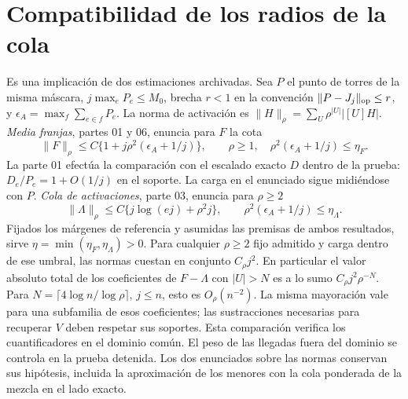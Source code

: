 \section{Compatibilidad de los radios de la cola}
Es una implicación de dos estimaciones archivadas. Sea $P$ el punto de torres
de la misma máscara, $j\max_e P_e\le M_0$, brecha $r<1$ en la convención
$\|P-J_j\|_{\rm op}\le r$, y $\epsilon_A=\max_f\sum_{e\in f}P_e$.
La norma de activación es $\|H\|_\rho=\sum_U\rho^{|U|}|[U]H|$.
\emph{Media franjas}, partes 01 y 06, enuncia para $F$ la cota
\[
 \|F\|_\rho\le C\{1+j\rho^2(\epsilon_A+1/j)\},
 \qquad \rho\ge1,\quad \rho^2(\epsilon_A+1/j)\le\eta_F .
\]
La parte 01 efectúa la comparación con el escalado exacto $D$ dentro de la prueba:
$D_e/P_e=1+O(1/j)$ en el soporte. La carga en el enunciado sigue midiéndose con $P$.
\emph{Cola de activaciones}, parte 03, enuncia para $\rho\ge2$
\[
 \|\Lambda\|_\rho\le C\{j\log(ej)+\rho^2j\},
 \qquad \rho^2(\epsilon_A+1/j)\le\eta_\Lambda .
\]
Fijados los márgenes de referencia y asumidas las premisas de ambos resultados,
sirve $\eta=\min(\eta_F,\eta_\Lambda)>0$. Para cualquier $\rho\ge2$ fijo admitido
y carga dentro de ese umbral, las normas cuestan en conjunto $C_\rho j^2$.
En particular el valor absoluto total de los coeficientes de $F-\Lambda$
con $|U|>N$ es a lo sumo $C_\rho j^2\rho^{-N}$. Para
$N=\lceil4\log n/\log\rho\rceil$, $j\le n$, esto es $O_\rho(n^{-2})$.
La misma mayoración vale para una subfamilia de esos coeficientes; las
sustracciones necesarias para recuperar $V$ deben respetar sus soportes.
Esta comparación verifica los cuantificadores en el dominio común.
El peso de las llegadas fuera del dominio se controla en la prueba detenida.
Los dos enunciados sobre las normas conservan sus hipótesis, incluida la
aproximación de los menores con la cola ponderada de la mezcla en el lado exacto.
